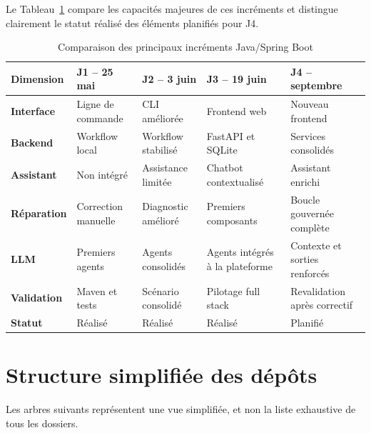 Le Tableau~\ref{tab:comparaison-demos-java-ch4} compare les capacités majeures de ces incréments et distingue clairement le statut réalisé des éléments planifiés pour J4.

\scriptsize
\begin{table}[H]
    \centering
    \caption{Comparaison des principaux incréments Java/Spring Boot}
    \label{tab:comparaison-demos-java-ch4}
    \begin{tabularx}{\textwidth}{|>{\bfseries\RaggedRight\arraybackslash}p{2.4cm}|>{\RaggedRight\arraybackslash}p{3cm}|>{\RaggedRight\arraybackslash}p{3cm}|>{\RaggedRight\arraybackslash}p{3cm}|>{\RaggedRight\arraybackslash}X|}
        \hline
        \rowcolor{cgilight!95}
        \textbf{Dimension} & \textbf{J1 -- 25 mai} & \textbf{J2 -- 3 juin} & \textbf{J3 -- 19 juin} & \textbf{J4 -- septembre} \\
        \hline
        Interface & Ligne de commande & CLI améliorée & Frontend web & Nouveau frontend \\
        \hline
        Backend & Workflow local & Workflow stabilisé & FastAPI et SQLite & Services consolidés \\
        \hline
        Assistant & Non intégré & Assistance limitée & Chatbot contextualisé & Assistant enrichi \\
        \hline
        Réparation & Correction manuelle & Diagnostic amélioré & Premiers composants & Boucle gouvernée complète \\
        \hline
        LLM & Premiers agents & Agents consolidés & Agents intégrés à la plateforme & Contexte et sorties renforcés \\
        \hline
        Validation & Maven et tests & Scénario consolidé & Pilotage full stack & Revalidation après correctif \\
        \hline
        Statut & Réalisé & Réalisé & Réalisé & Planifié \\
        \hline
    \end{tabularx}
\end{table}
\normalsize

\section{Structure simplifiée des dépôts}

Les arbres suivants représentent une vue simplifiée, et non la liste exhaustive de tous les dossiers.

